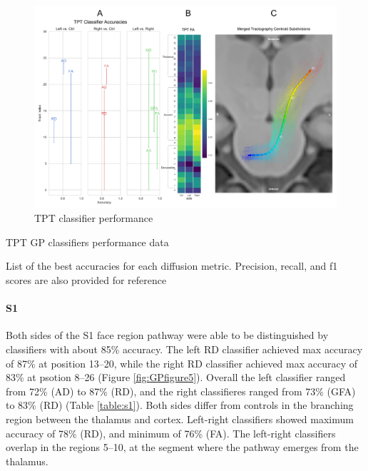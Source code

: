 \begin{figure}[ht]
\centering
\includegraphics[width=\linewidth]{figure-GP-TPT.pdf}
\caption{TPT classifier performance}
\label{fig:GPfigureTPT}
\end{figure}

\begin{table}[ht]
\centering
{}
\caption{TPT GP classifiers performance data}
\caption*{List of the best accuracies for each diffusion metric. Precision, recall, and f1 scores are also provided for reference}
\label{table:tpt}
\end{table}

\paragraph{S1}
Both sides of the S1 face region pathway were able to be distinguished by classifiers with about 85\% accuracy. The left RD classifier achieved max accuracy of 87\% at position 13--20, while the right RD classifier achieved max accuracy of 83\% at psotion 8--26 (Figure \ref{fig:GPfigure5}). Overall the left classifier ranged from 72\% (AD) to 87\% (RD), and the right classifieres ranged from 73\% (GFA) to 83\% (RD) (Table \ref{table:s1}). Both sides differ from controls in the branching region between the thalamus and cortex. Left-right classifiers showed maximum accuracy of 78\% (RD), and minimum of 76\% (FA). The left-right classifiers overlap in the regions 5--10, at the segment where the pathway emerges from the thalamus.


